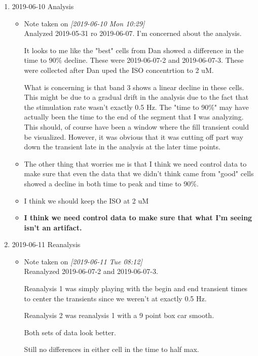 \documentclass[11pt]{article}
\begin{document}
\begin{enumerate}
\item 2019-06-10 Analysis
\label{sec:orgb8fb82a}
\begin{itemize}
\item Note taken on \textit{[2019-06-10 Mon 10:29] } \\
Analyzed 2019-05-31 ro 2019-06-07.  I'm concerned about the analysis.

It looks to me like the "best" cells from Dan showed a difference in the time to 90\% decline.  These were 2019-06-07-2 and 2019-06-07-3.  These were collected after Dan uped the ISO concentrtion to 2 uM.

What is concerning is that band 3 shows a linear decline in these cells.  This might be due to a gradual drift in the analysis due to the fact that the stimulation rate wasn't exactly 0.5 Hz.  The "time to 90\%" may have actually been the time to the end of the segment that I was analyzing.  This should, of course have been a window where the fill transient could be visualized.  However, it was obvious that it was cutting off part way down the transient late in the analysis at the later time points.

\item The other thing that worries me is that I think we need control data to make sure that even the data that we didn't think came from "good" cells showed a decline in both time to peak and time to 90\%.

\item I think we should keep the ISO at 2 uM

\item \textbf{I think we need control data to make sure that what I'm seeing isn't an artifact.}
\end{itemize}

\item 2019-06-11 Reanalysis
\label{sec:org9c31cf3}
\begin{itemize}
\item Note taken on \textit{[2019-06-11 Tue 08:12] } \\
Reanalyzed 2019-06-07-2 and 2019-06-07-3.

Reanalysis 1 was simply playing with the begin and end transient times to center the transients since we weren't at exactly 0.5 Hz.

Reanalysis 2 was reanalysis 1 with a 9 point box car smooth.

Both sets of data look better.

Still no differences in either cell in the time to half max.


\end{itemize}
\end{enumerate}
\end{document}

